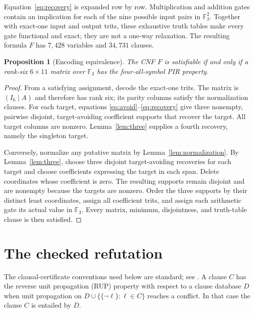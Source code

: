 \documentclass[11pt]{article}
\newtheorem{proposition}[theorem]{Proposition}
\newcommand{\F}{\mathbb F}
\begin{document}
Equation~\eqref{eq:recovery} is expanded row by row.  Multiplication and
addition gates contain an implication for each of the nine possible
input pairs in $\F_3^2$.  Together with exact-one input and output trits,
these exhaustive truth tables make every gate functional and exact;
they are not a one-way relaxation.  The resulting formula $F$ has
$7{,}428$ variables and $34{,}731$ clauses.

\begin{proposition}[Encoding equivalence]\label{prop:equivalence}
The CNF $F$ is satisfiable if and only if a rank-six
$6\times11$ matrix over $\F_3$ has the four-all-symbol PIR property.
\end{proposition}

\begin{proof}
From a satisfying assignment, decode the exact-one trits.  The matrix
is $(I_6\mid A)$ and therefore has rank six; its parity columns satisfy
the normalization clauses.  For each target, equations
\eqref{eq:avoid}--\eqref{eq:recovery} give three nonempty, pairwise
disjoint, target-avoiding coefficient supports that recover the target.
All target columns are nonzero.  Lemma~\ref{lem:three} supplies a fourth
recovery, namely the singleton target.

Conversely, normalize any putative matrix by
Lemma~\ref{lem:normalization}.  By Lemma~\ref{lem:three}, choose three
disjoint target-avoiding recoveries for each target and choose
coefficients expressing the target in each span.  Delete coordinates
whose coefficient is zero.  The resulting supports remain disjoint and
are nonempty because the targets are nonzero.  Order the three supports
by their distinct least coordinates, assign all coefficient trits, and
assign each arithmetic gate its actual value in $\F_3$.  Every matrix,
minimum, disjointness, and truth-table clause is then satisfied.
\end{proof}

\section{The checked refutation}

The clausal-certificate conventions used below are standard; see
\cite{WetzlerHeuleHunt2014,Heule2016}.  A clause $C$ has the reverse unit
propagation (RUP) property with respect to a clause database $D$ when
unit propagation on
$D\cup\{\{\lnot\ell\}:\ell\in C\}$ reaches a conflict.  In that case
the clause $C$ is entailed by $D$.
\end{document}
